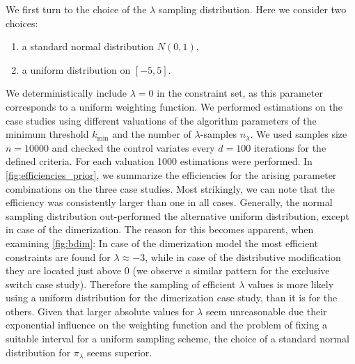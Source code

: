 We first turn to the choice of the $\lambda$ sampling distribution. Here we
consider two choices:
\begin{enumerate}
  \item a standard normal distribution $N(0,1)$,
  \item a uniform distribution on $[-5,5]$.
\end{enumerate}
We deterministically include $\lambda=0$ in the constraint set, as
this parameter
corresponds to a uniform weighting function.
We performed estimations on the case studies using different valuations of the
algorithm parameters of the minimum threshold $k_{\min}$ and
the number of $\lambda$-samples $n_{\lambda}$.
We used samples size $n=\num{10000}$ and checked the control
variates every $d=100$ iterations
for the defined criteria.
For each valuation \num{1000} estimations were performed.
In \autoref{fig:efficiencies_prior}, we summarize the efficiencies
for the arising parameter combinations on the three case studies.
Most strikingly, we can note that the efficiency was consistently
larger than one in
all cases.
Generally, the normal sampling distribution out-performed the
alternative uniform distribution, except in case of the dimerization.
The reason for this becomes apparent, when examining \autoref{fig:bdim}:
In case of the dimerization model the most efficient constraints are found for
$\lambda\approx -3$, while in case of the distributive modification
they are located
just above $0$ (we observe a similar pattern for the exclusive switch
case study).
Therefore the sampling of efficient $\lambda$ values is more likely
using a uniform distribution for the dimerization case study, than it
is for the others.
Given that larger absolute values for $\lambda$ seem unreasonable due
their exponential influence on the weighting function and the problem of fixing
a suitable interval for a uniform sampling scheme, the choice of a
standard normal
distribution for $\pi_{\lambda}$ seems superior.

